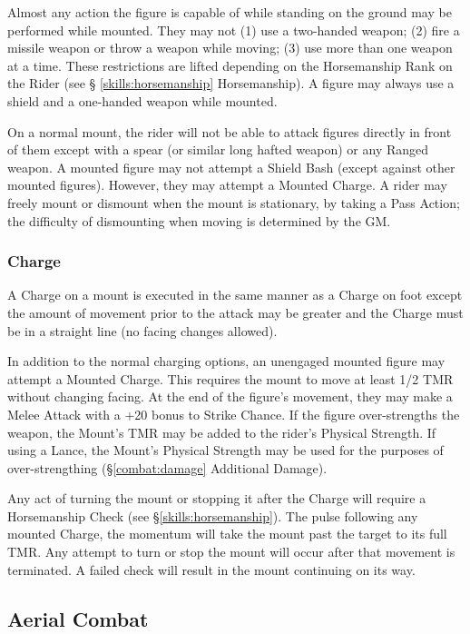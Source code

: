 \begin{multicols*}{3}
Almost any action the figure is capable of while standing on the
ground may be performed while mounted. They may not (1) use a
two-handed weapon; (2) fire a missile weapon or throw a weapon while
moving; (3) use more than one weapon at a time. These restrictions are
lifted depending on the Horsemanship Rank on the Rider (see \S
\ref{skills:horsemanship} Horsemanship). A figure may always use a shield and
a one-handed weapon while mounted.

On a normal mount, the rider will not be able to attack figures
directly in front of them except with a spear (or similar long hafted
weapon) or any Ranged weapon. A mounted figure may not attempt a
Shield Bash (except against other mounted figures). However, they may
attempt a Mounted Charge. A rider may freely mount or dismount when
the mount is stationary, by taking a Pass Action; the difficulty of
dismounting when moving is determined by the GM.

\subsubsection{Charge}

A Charge on a mount is executed in the same manner as a Charge on foot
except the amount of movement prior to the attack may be greater and
the Charge must be in a straight line (no facing changes allowed).

In addition to the normal charging options, an unengaged mounted
figure may attempt a Mounted Charge. This requires the mount to move
at least 1/2 TMR without changing facing. At the end of the figure's
movement, they may make a Melee Attack with a +20 bonus to Strike
Chance. If the figure over-strengths the weapon, the Mount's TMR may
be added to the rider's Physical Strength. If using a Lance, the
Mount's Physical Strength may be used for the purposes of
over-strengthing (\S\ref{combat:damage} Additional Damage).

Any act of turning the mount or stopping it after the Charge will
require a Horsemanship Check (see \S \ref{skills:horsemanship}). The
pulse following any mounted Charge, the momentum will take the mount
past the target to its full TMR. Any attempt to turn or stop the mount
will occur after that movement is terminated. A failed check will
result in the mount continuing on its way.

\subsection{Aerial Combat}


\end{multicols*}
